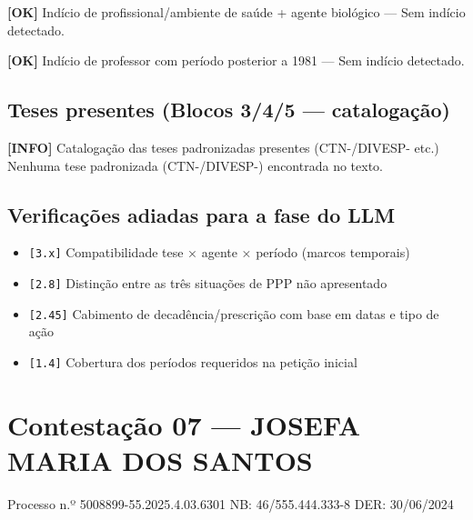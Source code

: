 \documentclass[12pt,a4paper]{article}
\newcommand{\statusOK}[1]{\textcolor{corOK}{\textbf{[OK]}} #1}
\newcommand{\statusINFO}[1]{\textcolor{corINFO}{\textbf{[INFO]}} #1}
\begin{document}
\medskip
\statusOK{Indício de profissional/ambiente de saúde + agente biológico} --- Sem indício detectado.

\medskip
\statusOK{Indício de professor com período posterior a 1981} --- Sem indício detectado.

\subsection{Teses presentes (Blocos 3/4/5 --- catalogação)}

\statusINFO{Catalogação das teses padronizadas presentes (CTN-/DIVESP- etc.)}\\
Nenhuma tese padronizada (CTN-/DIVESP-) encontrada no texto.

\subsection{Verificações adiadas para a fase do LLM}

\begin{itemize}
  \item \texttt{[3.x]} Compatibilidade tese × agente × período (marcos temporais)
  \item \texttt{[2.8]} Distinção entre as três situações de PPP não apresentado
  \item \texttt{[2.45]} Cabimento de decadência/prescrição com base em datas e tipo de ação
  \item \texttt{[1.4]} Cobertura dos períodos requeridos na petição inicial
\end{itemize}



\clearpage
{}
\section{Contestação 07 --- JOSEFA MARIA DOS SANTOS}
\begin{center}
  {\small Processo n.º 5008899-55.2025.4.03.6301 \quad NB: 46/555.444.333-8 \quad DER: 30/06/2024}
\end{center}
\end{document}
